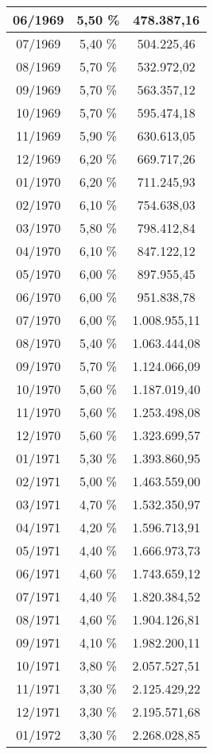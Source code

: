 \begin{center}
\begin{longtable}{|c|c|c|}
06/1969 & 5,50 \% & 478.387,16 \\ \hline
07/1969 & 5,40 \% & 504.225,46 \\ \hline
08/1969 & 5,70 \% & 532.972,02 \\ \hline
09/1969 & 5,70 \% & 563.357,12 \\ \hline
10/1969 & 5,70 \% & 595.474,18 \\ \hline
11/1969 & 5,90 \% & 630.613,05 \\ \hline
12/1969 & 6,20 \% & 669.717,26 \\ \hline
01/1970 & 6,20 \% & 711.245,93 \\ \hline
02/1970 & 6,10 \% & 754.638,03 \\ \hline
03/1970 & 5,80 \% & 798.412,84 \\ \hline
04/1970 & 6,10 \% & 847.122,12 \\ \hline
05/1970 & 6,00 \% & 897.955,45 \\ \hline
06/1970 & 6,00 \% & 951.838,78 \\ \hline
07/1970 & 6,00 \% & 1.008.955,11 \\ \hline
08/1970 & 5,40 \% & 1.063.444,08 \\ \hline
09/1970 & 5,70 \% & 1.124.066,09 \\ \hline
10/1970 & 5,60 \% & 1.187.019,40 \\ \hline
11/1970 & 5,60 \% & 1.253.498,08 \\ \hline
12/1970 & 5,60 \% & 1.323.699,57 \\ \hline
01/1971 & 5,30 \% & 1.393.860,95 \\ \hline
02/1971 & 5,00 \% & 1.463.559,00 \\ \hline
03/1971 & 4,70 \% & 1.532.350,97 \\ \hline
04/1971 & 4,20 \% & 1.596.713,91 \\ \hline
05/1971 & 4,40 \% & 1.666.973,73 \\ \hline
06/1971 & 4,60 \% & 1.743.659,12 \\ \hline
07/1971 & 4,40 \% & 1.820.384,52 \\ \hline
08/1971 & 4,60 \% & 1.904.126,81 \\ \hline
09/1971 & 4,10 \% & 1.982.200,11 \\ \hline
10/1971 & 3,80 \% & 2.057.527,51 \\ \hline
11/1971 & 3,30 \% & 2.125.429,22 \\ \hline
12/1971 & 3,30 \% & 2.195.571,68 \\ \hline
01/1972 & 3,30 \% & 2.268.028,85 \\ \hline

\end{longtable}
\end{center}
